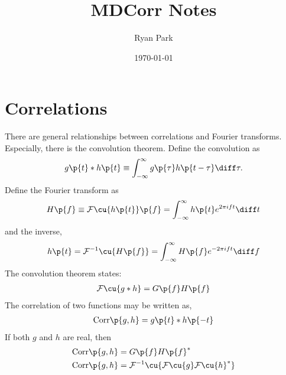 \documentclass[11pt, a4paper]{article}
\title{MDCorr Notes}
\author{Ryan Park}
\date{\today}
\begin{document}

\maketitle
\tableofcontents
\renewcommand{\vec}[1]{\boldsymbol{#1}}

\section{Correlations}

There are general relationships between correlations and Fourier transforms. Especially,
there is the convolution theorem. Define the convolution as
\begin{equation}\begin{aligned}
    g\p{t} * h\p{t} \equiv \int_{-\infty}^{\infty} g\p{\tau} h\p{t - \tau} \diff \tau. \\
\end{aligned}\end{equation}
Define the Fourier transform as
\begin{equation}\begin{aligned}
    H\p{f} \equiv \mathcal{F} \cu{h\p{t}} \p{f} = \int_{- \infty}^{\infty} h\p{t} e^{2 \pi i f t} \diff t
\end{aligned}\end{equation}
and the inverse,
\begin{equation}\begin{aligned}
    h\p{t} = \mathcal{F}^{-1}\cu{H\p{f}} = \int_{-\infty}^{\infty} H\p{f} e^{-2 \pi i f t} \diff f
\end{aligned}\end{equation}
The convolution theorem states:
\begin{equation}\begin{aligned}
    \mathcal{F} \cu{g * h} = G\p{f} H\p{f} \\
\end{aligned}\end{equation}
The correlation of two functions may be written as,
\begin{equation}\begin{aligned}
    \text{Corr}\p{g, h} = g\p{t} * h\p{-t} \\
\end{aligned}\end{equation}
If both $g$ and $h$ are real, then
\begin{equation}\begin{aligned}
    \text{Corr} \p{g, h} &= G\p{f} H\p{f}^{*} \\
    \text{Corr}\p{g, h} &= \mathcal{F}^{-1} \cu{ \mathcal{F} \cu{g} \mathcal{F}\cu{h}^{*}} \\
\end{aligned}\end{equation}
\end{document}
